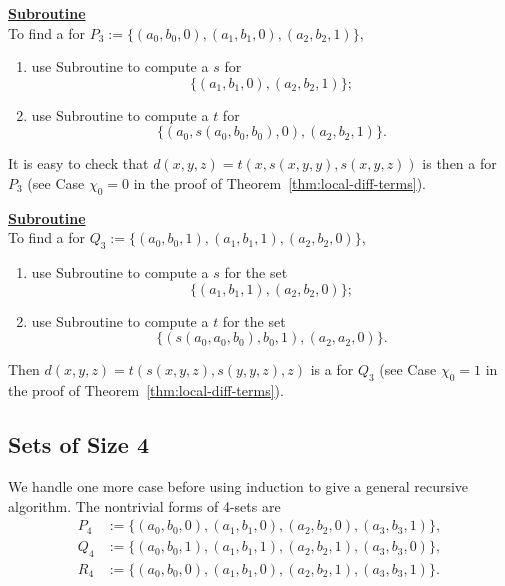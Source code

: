   \noindent \underline{\textbf{Subroutine }}\\[4pt]
  To find a \ldto for
  $P_3:=\{(a_0, b_0, 0), (a_1, b_1, 0),  (a_2, b_2, 1)\}$,
  \begin{enumerate}
  \item use Subroutine  to compute a \ldto $s$ for
  \begin{equation*}
  \{(a_1, b_1, 0), (a_2, b_2, 1)\};
  \end{equation*}
  \item use Subroutine  to compute a \ldto $t$ for
  \begin{equation*}
  \{(a_0, s(a_0, b_0, b_0), 0), (a_2, b_2, 1)\}.
  \end{equation*}
  \end{enumerate}
  It is easy to check that
  $d(x,y,z) = t(x, s(x,y,y), s(x,y,z))$
  is then a \ldto for $P_3$
  (see Case $\chi_0=0$ in the proof of Theorem~\ref{thm:local-diff-terms}).


  \noindent \underline{\textbf{Subroutine }}\\[4pt]
  To find a \ldto for
  $Q_3 := \{(a_0, b_0, 1), (a_1, b_1, 1), (a_2, b_2, 0)\}$,
  \begin{enumerate}
  \item \label{item:001-1}
  use Subroutine  to compute a \ldto $s$ for the set
  \begin{equation*}
  \{(a_1, b_1, 1), (a_2, b_2, 0)\};
  \end{equation*}
  \item \label{item:001-2} use Subroutine  to compute a \ldto $t$
  for the set
  \begin{equation*}
  \{(s(a_0, a_0, b_0), b_0, 1),  (a_2,a_2,0)\}.
  \end{equation*}
  \end{enumerate}
  Then
  $d(x,y,z) = t(s(x,y,z), s(y,y,z),z)$
  is a \ldto  for $Q_3$ (see Case $\chi_0=1$ in the proof of Theorem~\ref{thm:local-diff-terms}).

  \subsection{Sets of Size 4} We handle one more case before
  using induction to give a general recursive algorithm.
  The nontrivial forms of 4-sets are
  \begin{align*}
  P_4 &:= \{(a_0, b_0, 0), (a_1, b_1, 0),  (a_2, b_2, 0),  (a_3, b_3, 1)\},\\
  Q_4 &:= \{(a_0, b_0, 1), (a_1, b_1, 1), (a_2, b_2, 1), (a_3, b_3, 0)\},\\
  R_4 &:= \{(a_0, b_0, 0), (a_1, b_1, 0),  (a_2, b_2, 1),  (a_3, b_3, 1)\}.
  \end{align*}

